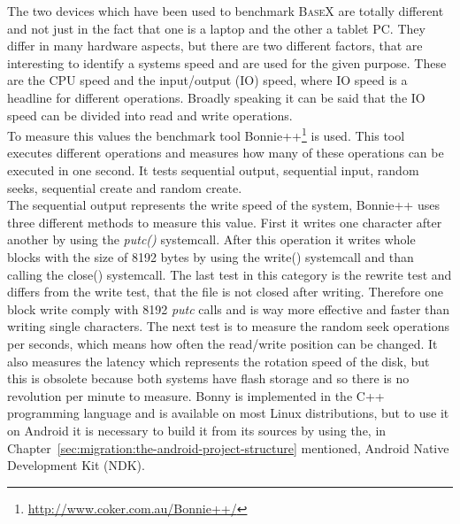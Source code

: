 The two devices which have been used to benchmark \textsc{BaseX} are totally different and not just in the fact that one is a laptop and the other a tablet PC.
They differ in many hardware aspects, but there are two different factors, that are interesting to identify a systems speed and are used for the given purpose.
These are the CPU speed and the input/output (IO) speed, where IO speed is a headline for different operations.
Broadly speaking it can be said that the IO speed can be divided into read and write operations.\\
To measure this values the benchmark tool Bonnie++\footnote{\url{http://www.coker.com.au/Bonnie++/}} is used.
This tool executes different operations and measures how many of these operations can be executed in one second.
It tests sequential output, sequential input, random seeks, sequential create and random create.\\
The sequential output represents the write speed of the system, Bonnie++ uses three different methods to measure this value.
First it writes one character after another by using the \textit{putc()} systemcall. 
After this operation it writes whole blocks with the size of 8192 bytes by using the write() systemcall and than calling the close() systemcall.
The last test in this category is the rewrite test and differs from the write test, that the file is not closed after writing.
Therefore one block write comply with 8192 \textit{putc} calls and is way more effective and faster than writing single characters.
The next test is to measure the random seek operations per seconds, which means how often the read/write position can be changed.
It also measures the latency which represents the rotation speed of the disk, but this is obsolete because both systems have flash storage and so there is no revolution per minute to measure.
Bonny is implemented in the C++ programming language and is available on most Linux distributions, but to use it on Android it is necessary to build it from its sources by using the, in Chapter~\ref{sec:migration:the-android-project-structure} mentioned, Android Native Development Kit (NDK).
